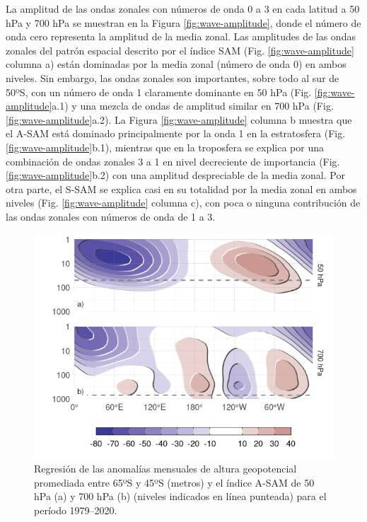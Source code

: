 \documentclass[12pt,oneside,a4paper]{reedthesis}
\begin{document}
La amplitud de las ondas zonales con números de onda 0 a 3 en cada latitud a 50 hPa y 700 hPa se muestran en la Figura \ref{fig:wave-amplitude}, donde el número de onda cero representa la amplitud de la media zonal.
Las amplitudes de las ondas zonales del patrón espacial descrito por el índice SAM (Fig. \ref{fig:wave-amplitude} columna a) están dominadas por la media zonal (número de onda 0) en ambos niveles.
Sin embargo, las ondas zonales son importantes, sobre todo al sur de 50ºS, con un número de onda 1 claramente dominante en 50 hPa (Fig. \ref{fig:wave-amplitude}a.1) y una mezcla de ondas de amplitud similar en 700 hPa (Fig. \ref{fig:wave-amplitude}a.2).
La Figura \ref{fig:wave-amplitude} columna b muestra que el A-SAM está dominado principalmente por la onda 1 en la estratosfera (Fig. \ref{fig:wave-amplitude}b.1), mientras que en la troposfera se explica por una combinación de ondas zonales 3 a 1 en nivel decreciente de importancia (Fig. \ref{fig:wave-amplitude}b.2) con una amplitud despreciable de la media zonal.
Por otra parte, el S-SAM se explica casi en su totalidad por la media zonal en ambos niveles (Fig. \ref{fig:wave-amplitude} columna c), con poca o ninguna contribución de las ondas zonales con números de onda de 1 a 3.



\begin{figure}

{\centering \includegraphics{figures/30-sam/vertical-regression-1} 

}

\caption{Regresión de las anomalías mensuales de altura geopotencial promediada entre 65ºS y 45ºS (metros) y el índice A-SAM de 50 hPa (a) y 700 hPa (b) (niveles indicados en línea punteada) para el período 1979--2020.}\label{fig:vertical-regression}
\end{figure}
\end{document}
